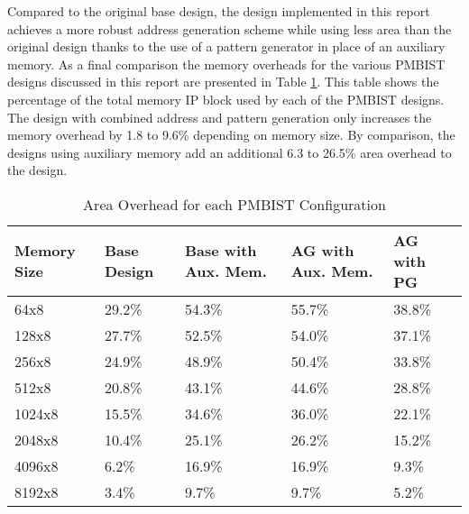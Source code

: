 Compared to the original base design, the design implemented in this report achieves a more robust address generation scheme while using less area than the original design thanks to the use of a pattern generator in place of an auxiliary memory.  As a final comparison the memory overheads for the various PMBIST designs discussed in this report are presented in Table \ref{tab:all_overhead}.  This table shows the percentage of the total memory IP block used by each of the PMBIST designs.  The design with combined address and pattern generation only increases the memory overhead by 1.8 to 9.6\% depending on memory size.  By comparison, the designs using auxiliary memory add an additional 6.3 to 26.5\% area overhead to the design.  

\begin{table}[h]
\caption{Area Overhead for each PMBIST Configuration}
\centering
\begin{tabular}{|p{0.75in}| p{0.6in}| p{0.9in}| p{0.9in}| p{0.6in}|}
\hline
Memory Size & Base Design & Base with Aux. Mem. & AG with Aux. Mem. & AG with PG  \\
\hline\hline
64x8   & 29.2\% & 54.3\% & 55.7\% & 38.8\% \\
128x8  & 27.7\% & 52.5\% & 54.0\% & 37.1\% \\
256x8  & 24.9\% & 48.9\% & 50.4\% & 33.8\% \\
512x8  & 20.8\% & 43.1\% & 44.6\% & 28.8\% \\
1024x8 & 15.5\% & 34.6\% & 36.0\% & 22.1\% \\
2048x8 & 10.4\% & 25.1\% & 26.2\% & 15.2\% \\
4096x8 &  6.2\% & 16.9\% & 16.9\% &  9.3\% \\
8192x8 &  3.4\% &  9.7\% &  9.7\% &  5.2\% \\ [0.5ex]
\hline
\end{tabular}
\label{tab:all_overhead}
\end{table}




